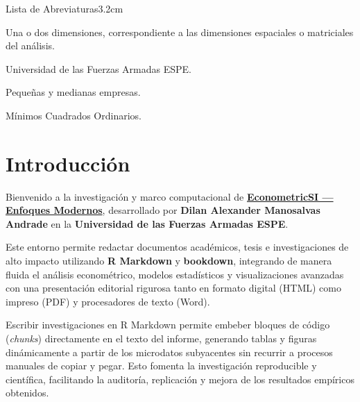 \documentclass[a4paper, nobind]{templates/ociamthesis}
\begin{document}
\begin{romanpages}
\begin{mclistof}{Lista de Abreviaturas}{3.2cm}
\item[1-D, 2-D]

Una o dos dimensiones, correspondiente a las dimensiones espaciales o matriciales del análisis.

\item[ESPE]

Universidad de las Fuerzas Armadas ESPE.

\item[PYMES]

Pequeñas y medianas empresas.

\item[MCO]

Mínimos Cuadrados Ordinarios.

\end{mclistof} 


\end{romanpages}

\flushbottom

\chapter*{Introducción}\label{introducciuxf3n}

\adjustmtc
{}

Bienvenido a la investigación y marco computacional de \textbf{\href{https://econometricis.vercel.app/}{EconometricSI --- Enfoques Modernos}}, desarrollado por \textbf{Dilan Alexander Manosalvas Andrade} en la \textbf{Universidad de las Fuerzas Armadas ESPE}.

Este entorno permite redactar documentos académicos, tesis e investigaciones de alto impacto utilizando \textbf{R Markdown} y \textbf{bookdown}, integrando de manera fluida el análisis econométrico, modelos estadísticos y visualizaciones avanzadas con una presentación editorial rigurosa tanto en formato digital (HTML) como impreso (PDF) y procesadores de texto (Word).

Escribir investigaciones en R Markdown permite embeber bloques de código (\emph{chunks}) directamente en el texto del informe, generando tablas y figuras dinámicamente a partir de los microdatos subyacentes sin recurrir a procesos manuales de copiar y pegar. Esto fomenta la investigación reproducible y científica, facilitando la auditoría, replicación y mejora de los resultados empíricos obtenidos.
\end{document}
